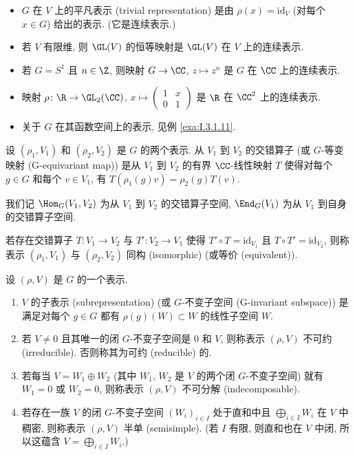 \begin{example}[连续表示的例子]
\label{exa:I.3.1.4}
\begin{itemize}
\item $G$ 在 $V$ 上的平凡表示 (trivial representation) 是由 $\rho(x) = \mathrm{id}_V$ (对每个 $x \in G$) 给出的表示. (它是连续表示.)
\item 若 $V$ 有限维, 则 $\GL(V)$ 的恒等映射是 $\GL(V)$ 在 $V$ 上的连续表示.
\item 若 $G = S^1$ 且 $n \in \Z$, 则映射 $G \to \CC$, $z \longmapsto z^n$ 是 $G$ 在 $\CC$ 上的连续表示.
\item 映射 $\rho \colon \R \to \GL_2(\CC)$, $x \longmapsto \begin{pmatrix} 1 & x \\ 0 & 1 \end{pmatrix}$ 是 $\R$ 在 $\CC^2$ 上的连续表示.
\item 关于 $G$ 在其函数空间上的表示, 见例 \ref{exa:I.3.1.11}.
\end{itemize}
\end{example}

\begin{definition}
\label{def:I.3.1.5}
设 $(\rho_1, V_1)$ 和 $(\rho_2, V_2)$ 是 $G$ 的两个表示. 从 $V_1$ 到 $V_2$ 的交错算子 (或 $G$-等变映射 (G-equivariant map)) 是从 $V_1$ 到 $V_2$ 的有界 $\CC$-线性映射 $T$ 使得对每个 $g \in G$ 和每个 $v \in V_1$, 有 $T(\rho_1(g)v) = \rho_2(g)T(v)$.

我们记 $\Hom_G(V_1, V_2)$ 为从 $V_1$ 到 $V_2$ 的交错算子空间, $\End_G(V_1)$ 为从 $V_1$ 到自身的交错算子空间.

若存在交错算子 $T \colon V_1 \to V_2$ 与 $T' \colon V_2 \to V_1$ 使得 $T' \circ T = \mathrm{id}_{V_1}$ 且 $T \circ T' = \mathrm{id}_{V_2}$, 则称表示 $(\rho_1, V_1)$ 与 $(\rho_2, V_2)$ 同构 (isomorphic) (或等价 (equivalent)).
\end{definition}

\begin{definition}
\label{def:I.3.1.6}
设 $(\rho, V)$ 是 $G$ 的一个表示.
\begin{enumerate}
\item[(1)] $V$ 的子表示 (subrepresentation) (或 $G$-不变子空间 (G-invariant subspace)) 是满足对每个 $g \in G$ 都有 $\rho(g)(W) \subset W$ 的线性子空间 $W$.
\item[(2)] 若 $V \neq 0$ 且其唯一的闭 $G$-不变子空间是 $0$ 和 $V$, 则称表示 $(\rho, V)$ 不可约 (irreducible). 否则称其为可约 (reducible) 的.
\item[(3)] 若每当 $V = W_1 \oplus W_2$ (其中 $W_1$, $W_2$ 是 $V$ 的两个闭 $G$-不变子空间) 就有 $W_1 = 0$ 或 $W_2 = 0$, 则称表示 $(\rho, V)$ 不可分解 (indecomposable).
\item[(4)] 若存在一族 $V$ 的闭 $G$-不变子空间 $(W_i)_{i \in I}$ 处于直和中且 $\bigoplus_{i \in I} W_i$ 在 $V$ 中稠密, 则称表示 $(\rho, V)$ 半单 (semisimple). (若 $I$ 有限, 则直和也在 $V$ 中闭, 所以这蕴含 $V = \bigoplus_{i \in I} W_i$.)
\end{enumerate}
\end{definition}

